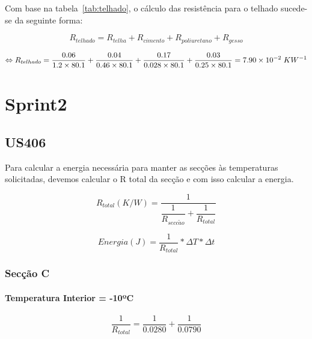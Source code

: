 \documentclass[12pt, a4paper]{article}
\begin{document}
Com base na tabela~\ref*{tab:telhado}, o cálculo das resistência para o telhado sucede-se da seguinte forma:

\begin{equation}
	R_{telhado} = R_{telha} + R_{cimento} + R_{poliuretano} + R_{gesso}
	\label{eq:telhado1}
\end{equation}

\begin{equation}
	\Leftrightarrow R_{telhado} =
	\dfrac{0.06}{1.2 \times 80.1} +
	\dfrac{0.04}{0.46 \times 80.1} +
	\dfrac{0.17}{0.028 \times 80.1} +
	\dfrac{0.03}{0.25 \times 80.1} = 7.90 \times 10^{-2} \hspace{1mm} KW^{-1}
	\label{eq:telhado2}
\end{equation}



\section{Sprint2}\label{Sprint2}
\subsection{US406}

Para calcular a energia necessária para manter as secções às temperaturas solicitadas, devemos calcular o R total da secção e com isso calcular a energia.

\begin{equation}
	R_{total} (K/W)=
		\dfrac{1}{
		\dfrac{1}{R_{secc\tilde{a}o}} +
		\dfrac{1}{R_{total}}
		}
	\label{eq:total}
\end{equation}

\begin{equation}
	Energia (J)=
	\dfrac{1}{R_{total}} *
	\Delta T *
	\Delta t
	\label{eq:energia}
\end{equation}


\subsubsection{Secção C}\label{seccaoC}
\paragraph{Temperatura Interior = -10ºC}

\begin{equation}
	\dfrac{1}{R_{total}} =
	\dfrac{1}{0.0280} +
	\dfrac{1}{0.0790}
	\label{eq:totalC1}
\end{equation}
\end{document}
